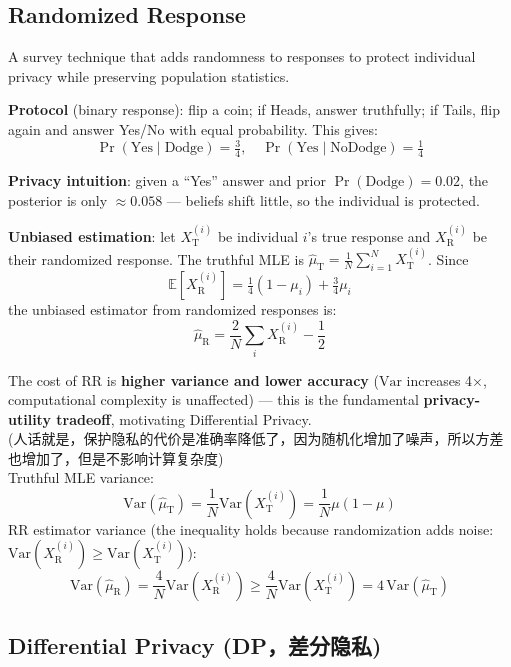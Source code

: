 \documentclass[UTF8]{ctexart}
\begin{document}
\subsection{Randomized Response}

A survey technique that adds randomness to responses to protect individual privacy while preserving population statistics.

\textbf{Protocol} (binary response): flip a coin; if Heads, answer truthfully; if Tails, flip again and answer Yes/No with equal probability. This gives:
\[
    \Pr(\text{Yes} \mid \text{Dodge}) = \tfrac{3}{4}, \quad \Pr(\text{Yes} \mid \text{NoDodge}) = \tfrac{1}{4}
\]

\textbf{Privacy intuition}: given a ``Yes'' answer and prior $\Pr(\text{Dodge})=0.02$, the posterior is only $\approx 0.058$ — beliefs shift little, so the individual is protected.

\textbf{Unbiased estimation}: let $X_\mathrm{T}^{(i)}$ be individual $i$'s true response and $X_\mathrm{R}^{(i)}$ be their randomized response. The truthful MLE is $\hat{\mu}_\mathrm{T} = \frac{1}{N}\sum_{i=1}^N X_\mathrm{T}^{(i)}$. Since
\[
    \mathbb{E}\!\left[X_\mathrm{R}^{(i)}\right] = \tfrac{1}{4}(1-\mu_i) + \tfrac{3}{4}\mu_i
\]
the unbiased estimator from randomized responses is:
\[
    \hat{\mu}_\mathrm{R} = \frac{2}{N}\sum_i X_\mathrm{R}^{(i)} - \frac{1}{2}
\]

The cost of RR is \textbf{higher variance and lower accuracy} ($\mathrm{Var}$ increases 4$\times$, computational complexity is unaffected) — this is the fundamental \textbf{privacy-utility tradeoff}, motivating Differential Privacy. \\
(人话就是，保护隐私的代价是准确率降低了，因为随机化增加了噪声，所以方差也增加了，但是不影响计算复杂度)
\\
Truthful MLE variance:
\[
    \mathrm{Var}(\hat{\mu}_\mathrm{T}) = \frac{1}{N}\mathrm{Var}\!\left(X_\mathrm{T}^{(i)}\right) = \frac{1}{N}\mu(1-\mu)
\]
RR estimator variance (the inequality holds because randomization adds noise: $\mathrm{Var}(X_\mathrm{R}^{(i)}) \geq \mathrm{Var}(X_\mathrm{T}^{(i)})$):
\[
    \mathrm{Var}(\hat{\mu}_\mathrm{R}) = \frac{4}{N}\mathrm{Var}\!\left(X_\mathrm{R}^{(i)}\right) \geq \frac{4}{N}\mathrm{Var}\!\left(X_\mathrm{T}^{(i)}\right) = 4\,\mathrm{Var}(\hat{\mu}_\mathrm{T})
\]

\subsection{Differential Privacy (DP，差分隐私)}
\end{document}
